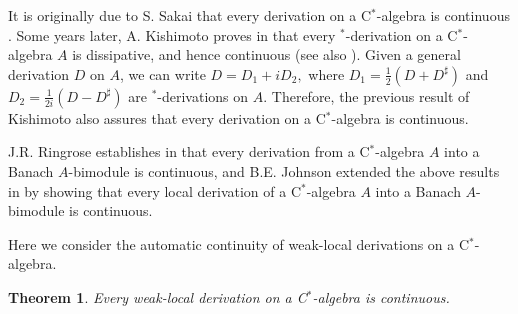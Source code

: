 \documentclass[11pt]{amsart}
\newtheorem{theorem}{Theorem}[section]
\begin{document}
It is originally due to S. Sakai that every derivation on a C$^*$-algebra is continuous \cite{Sak60}. Some years later, A. Kishimoto proves in \cite[Corollary, page 27]{Kishi76} that every $^*$-derivation on a C$^*$-algebra $A$ is dissipative, and hence continuous (see also \cite[\S 1.4]{Bra1986}). Given a general derivation $D$ on $A$, we can write $D = D_1 + i D_2,$ where $D_1 = \frac12 (D+ D^{\sharp})$ and $D_2 = \frac{1}{2 i} (D- D^{\sharp})$ are $^*$-derivations on $A$. Therefore, the previous result of Kishimoto also assures that every derivation on a C$^*$-algebra is continuous.\smallskip

J.R. Ringrose establishes in \cite{Ringrose72} that every derivation from a C$^*$-algebra $A$ into a Banach $A$-bimodule is continuous, and B.E. Johnson extended the above results in \cite[Theorem 7.5]{John01} by showing that every local derivation of a C$^*$-algebra $A$ into a Banach $A$-bimodule is continuous.\smallskip

Here we consider the automatic continuity of weak-local derivations on a C$^*$-algebra.

\begin{theorem}\label{thm cont weak local derivations}
Every weak-local derivation on a C$^*$-algebra is continuous.
\end{theorem}
\end{document}
